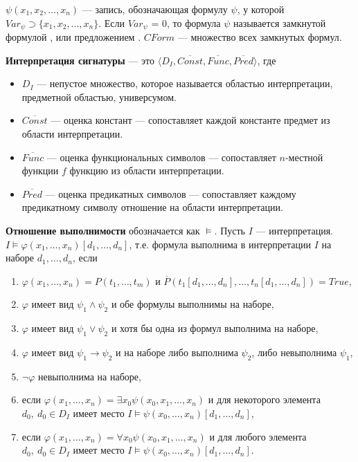 $\psi(x_1, x_2,\ldots, x_n)$ — запись, обозначающая формулу $\psi$, у которой $ Var_{\psi} \supset \{x_1, x_2,..., x_n\}$.
Если ${Var}_{\psi}$ = 0, то формула $\psi$ называется
замкнутой формулой , или предложением .
$CForm$ — множество всех замкнутых формул.

\textbf{Интерпретация сигнатуры} --- это $\langle D_I, \overline{Const}, \overline{Func}, \overline{Pred} \rangle$, где
    \begin{itemize}
        \item $D_I$ --- непустое множество, которое называется областью интерпретации, предметной областью, универсумом.
        \item $\overline{Const}$ --- оценка констант --- сопоставляет каждой константе предмет из области интерпретации.
        \item $\overline{Func}$ --- оценка функциональных символов --- сопоставляет $n$-местной функции $f$ функцию из области интерпретации.
        \item $\overline{Pred}$ --- оценка предикатных символов --- сопоставляет каждому предикатному символу отношение на области интерпретации.
    \end{itemize}
    

\textbf{Отношение выполнимости} обозначается как $\models$.
Пусть $I$ --- интерпретация.
\newline $I \models \varphi(x_1 , \dots, x_n)[d_1 , \dots, d_n]$, т.е. формула выполнима в интерпретации $I$ на наборе $d_1, \dots, d_n$, если
\begin{enumerate}
    \item $\varphi(x_1, \dots, x_n) = P(t_1, \dots, t_m)$ и $ \overline{P} \left(t_1 [d_1 , \dots, d_n], \dots, t_n [d_1 , \dots, d_n]\right) = True $,
    \item $\varphi$ имеет вид $\psi_1 \wedge \psi_2$ и обе формулы выполнимы на наборе,
    \item $\varphi$ имеет вид $\psi_1 \vee \psi_2$ и хотя бы одна из формул выполнима на наборе,
    \item $\varphi$ имеет вид $\psi_1 \rightarrow \psi_2$ и на наборе либо выполнима $\psi_2$, либо невыполнима $\psi_1$,
    \item $\neg \varphi$ невыполнима на наборе,
    \item если $\varphi(x_1, \dots, x_n) = \exists x_0 \psi(x_0, x_1, \dots, x_n)$ и для некоторого элемента $d_0,~d_0 \in D_I$ имеет место $I \models \psi(x_0, \dots, x_n)[d_1, \dots, d_n]$,
    \item если $\varphi(x_1, \dots, x_n) = \forall x_0 \psi(x_0, x_1, \dots, x_n)$ и для любого элемента $d_0,~d_0 \in D_I$ имеет место $I \models \psi(x_0, \dots, x_n)[d_1, \dots, d_n]$.
\end{enumerate}

